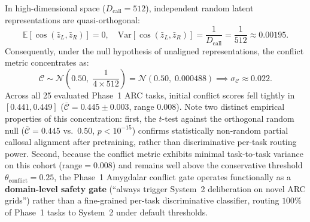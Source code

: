 \documentclass[11pt,a4paper]{article}
\theoremstyle{plain}
\theoremstyle{definition}
\theoremstyle{remark}
\begin{document}
In high-dimensional space ($D_{\mathrm{call}} = 512$), independent random latent representations are quasi-orthogonal:
\begin{equation}
    \mathbb{E}[\cos(\bar{z}_L, \bar{z}_R)] = 0, \quad \mathrm{Var}[\cos(\bar{z}_L, \bar{z}_R)] = \frac{1}{D_{\mathrm{call}}} = \frac{1}{512} \approx 0.00195.
\end{equation}
Consequently, under the null hypothesis of unaligned representations, the conflict metric concentrates as:
\begin{equation}
    \mathcal{C} \sim \mathcal{N}\left(0.50, \; \frac{1}{4 \times 512}\right) = \mathcal{N}(0.50, \; 0.000488) \implies \sigma_{\mathcal{C}} \approx 0.022.
\end{equation}
Across all 25 evaluated Phase~1 ARC tasks, initial conflict scores fell tightly in $[0.441, 0.449]$ ($\bar{\mathcal{C}} = 0.445 \pm 0.003$, range $0.008$). Note two distinct empirical properties of this concentration: first, the $t$-test against the orthogonal random null ($\bar{\mathcal{C}} = 0.445$ vs.\ $0.50$, $p \lt 10^{-15}$) confirms statistically non-random partial callosal alignment after pretraining, rather than discriminative per-task routing power. Second, because the conflict metric exhibits minimal task-to-task variance on this cohort ($\text{range} = 0.008$) and remains well above the conservative threshold $\theta_{\mathrm{conflict}} = 0.25$, the Phase~1 Amygdalar conflict gate operates functionally as a \textbf{domain-level safety gate} (``always trigger System~2 deliberation on novel ARC grids'') rather than a fine-grained per-task discriminative classifier, routing $100\%$ of Phase~1 tasks to System~2 under default thresholds.
\end{document}
